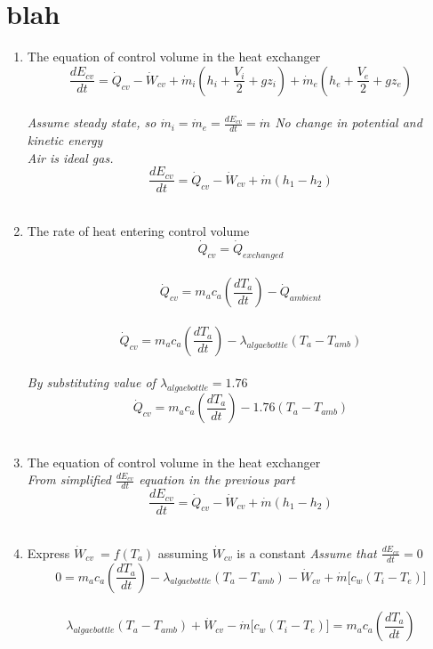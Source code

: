 \documentclass[10pt,a4paper]{IEEEtran}
\begin{document}
	\section{blah}
	\begin{enumerate}
		\def\labelenumi{\roman{enumi}.}
		\item The equation of control volume in the heat exchanger
		$$\frac{dE_{cv}}{dt} = \dot{Q}_{cv} - \dot{W}_{cv} + \dot{m}_{i} \left( h_i + \frac{V_i}{2} + gz_i \right) + \dot{m}_{e} \left( h_e + \frac{V_e}{2} + gz_e \right)$$ \\
		\textit{Assume steady state, so $\dot{m}_{i} = \dot{m}_{e} = \frac{dE_{cv}}{dt} = \dot{m}$ No change in potential and kinetic energy} \\
		\textit{Air is ideal gas.} \\
		$$\frac{dE_{cv}}{dt} = \dot{Q}_{cv} - \dot{W}_{cv} + \dot{m} \left( h_1 - h_2 \right)$$ \\
		\item The rate of heat entering control volume \\
		$$\dot{Q}_{cv} = \dot{Q}_{exchanged}$$ \\
		$$\dot{Q}_{cv} = m_a c_a \left( \frac{dT_a}{dt} \right) - \dot{Q}_{ambient}$$ \\
		$$\dot{Q}_{cv} = m_a c_a \left( \frac{dT_a}{dt} \right) - \lambda_{algaebottle} \left( T_a - T_{amb} \right)$$ \\
		\textit{By substituting value of $\lambda_{algaebottle} = 1.76$} \\
		$$\dot{Q}_{cv} = m_a c_a \left( \frac{dT_a}{dt} \right) - 1.76 \left( T_a - T_{amb} \right)$$ \\
		\item The equation of control volume in the heat exchanger \\
		\textit{From simplified $\frac{dE_{cv}}{dt}$ equation in the previous part} \\
		$$\frac{dE_{cv}}{dt} = \dot{Q}_{cv} - \dot{W}_{cv} + \dot{m} \left( h_1 - h_2 \right)$$ \\
		\item Express $\dot{W}_{cv}\ = f \left( T_a \right)$ assuming $\dot{W}_{cv}$ is a constant
		\textit{Assume that $\frac{dE_{cv}}{dt} = 0$} \\
		$$0 = m_a c_a \left( \frac{dT_a}{dt} \right) - \lambda_{algaebottle} \left( T_a - T_{amb} \right) - \dot{W}_{cv} + \dot{m} \lbrack c_w \left( T_i - T_e \right) \rbrack$$ \\
		$$\lambda_{algaebottle} \left( T_a - T_{amb} \right) + \dot{W}_{cv} - \dot{m} \lbrack c_w \left( T_i - T_e \right) \rbrack = m_a c_a \left( \frac{dT_a}{dt} \right)$$ \\

\end{enumerate}
\end{document}
